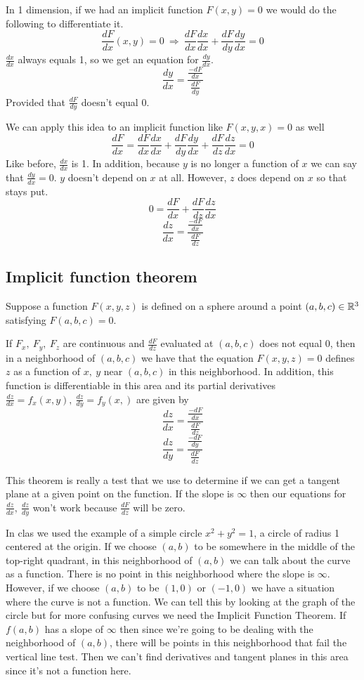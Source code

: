 \documentclass[12 pt]{article}
\begin{document}
        In 1 dimension, if we had an implicit function $F(x,y)=0$ we would do the following to differentiate it.
        $$\frac{dF}{dx}(x,y)=0\ \Rightarrow\ \frac{dF}{dx}\frac{dx}{dx}+\frac{dF}{dy}\frac{dy}{dx}=0$$
        $\frac{dx}{dx}$ always equals 1, so we get an equation for $\frac{dy}{dx}$.
        $$\frac{dy}{dx}=\frac{\frac{-dF}{dx}}{\frac{dF}{dy}}$$
        Provided that $\frac{dF}{dy}$ doesn't equal 0.

        We can apply this idea to an implicit function like $F(x,y,x)=0$ as well
        $$\frac{dF}{dx}=\frac{dF}{dx}\frac{dx}{dx}+\frac{dF}{dy}\frac{dy}{dx}+\frac{dF}{dz}\frac{dz}{dx}=0$$
        Like before, $\frac{dx}{dx}$ is 1. In addition, because $y$ is no longer a function of $x$ we can say that $\frac{dy}{dx}=0$. $y$ doesn't depend on $x$ at all. However, $z$ does depend on $x$ so that stays put.
        $$0=\frac{dF}{dx}+\frac{dF}{dz}\frac{dz}{dx}$$
        $$\frac{dz}{dx}=\frac{\frac{-dF}{dx}}{\frac{dF}{dz}}$$

        \subsection{Implicit function theorem}

        Suppose a function $F(x,y,z)$ is defined on a sphere around a point $(a,b,c)\in\mathbb{R}^3$ satisfying $F(a,b,c)=0$.

        If $F_x,\ F_y,\ F_z$ are continuous and $\frac{dF}{dz}$ evaluated at $(a,b,c)$ does not equal 0, then in a neighborhood of $(a,b,c)$ we have that the equation $F(x,y,z)=0$ defines $z$ as a function of $x,\ y$ near $(a,b,c)$ in this neighborhood. In addition, this function is differentiable in this area and its partial derivatives $\frac{dz}{dx}=f_x(x,y),\ \frac{dz}{dy}=f_y(x,)$ are given by
        $$\frac{dz}{dx}=\frac{\frac{-dF}{dx}}{\frac{dF}{dz}}$$
        $$\frac{dz}{dy}=\frac{\frac{-dF}{dy}}{\frac{dF}{dz}}$$

        This theorem is really a test that we use to determine if we can get a tangent plane at a given point on the function. If the slope is $\infty$ then our equations for $\frac{dz}{dx},\ \frac{dz}{dy}$ won't work because $\frac{dF}{dz}$ will be zero.

        In clas we used the example of a simple circle $x^2+y^2=1$, a circle of radius 1 centered at the origin. If we choose $(a,b)$ to be somewhere in the middle of the top-right quadrant, in this neighborhood of $(a,b)$ we can talk about the curve as a function. There is no point in this neighborhood where the slope is $\infty$. However, if we choose $(a,b)$ to be $(1,0)$ or $(-1,0)$ we have a situation where the curve is not a function. We can tell this by looking at the graph of the circle but for more confusing curves we need the Implicit Function Theorem. If $f(a,b)$ has a slope of $\infty$ then since we're going to be dealing with the neighborhood of $(a,b)$, there will be points in this neighborhood that fail the vertical line test. Then we can't find derivatives and tangent planes in this area since it's not a function here.
\end{document}
